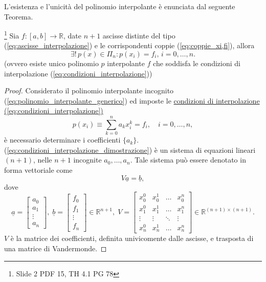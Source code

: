 L'esistenza e l'unicità del polinomio interpolante è enunciata dal seguente Teorema.
\begin{theorem}\label{th:esistenza_unicita_polinomio_interpolante}\footnote{Slide 2 PDF 15, TH 4.1 PG 78}
    Sia $f\colon [a,b]\rightarrow\mathbb{R}$, date $n+1$ ascisse distinte del tipo (\ref{eq:ascisse_interpolazione}) e le corrispondenti coppie (\ref{eq:coppie_xi,fi}), allora
    \begin{equation*}
    	\exists!\, p(x)\in\Pi_n: p(x_i)=f_i,\, i=0,\hdots,n.
    \end{equation*}
    (ovvero esiste unico polinomio $p$ interpolante $f$ che soddisfa le condizioni di interpolazione (\ref{eq:condizioni_interpolazione}))
\end{theorem}
\begin{proof}
    Considerato il polinomio interpolante incognito (\ref{eq:polinomio_interpolante_generico}) ed imposte le \underline{condizioni di interpolazione (\ref{eq:condizioni_interpolazione})} 
    \begin{equation}\label{eq:condizioni_interpolazione_dimostrazione}
        p(x_i)\equiv\sum_{k=0}^{n}a_kx_i^k=f_i,\quad i=0,\hdots,n,
    \end{equation}
    è necessario determinare i coefficienti $\{a_k\}$. (\ref{eq:condizioni_interpolazione_dimostrazione}) è un sistema di equazioni lineari $(n+1)$, nelle $n+1$ incognite $a_0,\hdots,a_n$. Tale sistema può essere denotato in forma vettoriale come
    \begin{equation}\label{eq:sistema_lineare_vandermonde}
        V\underline{a}=\underline{b},
    \end{equation}
    dove
    \begin{equation*}
        \underline{a} = 
    \begin{bmatrix}
        a_0\\
        a_1\\
        \vdots\\
        a_n
    \end{bmatrix},\; \underline{b}=
    \begin{bmatrix}
        f_0\\
        f_1\\
        \vdots\\
        f_n
    \end{bmatrix}\in\mathbb R^{n+1},\;
    V=\begin{bmatrix}
        x_0^0 & x_0^1 & \hdots & x_0^n\\
        x_1^0 & x_1^1 & \hdots & x_1^n\\
        \vdots & \vdots &\ddots & \vdots\\
        x_n^0 & x_n^1 & \hdots & x_n^n
    \end{bmatrix}\in\mathbb R^{(n+1)\times (n+1)}.
    \end{equation*}
    $V$ è la matrice dei coefficienti, definita univicomente dalle ascisse, e trasposta di una matrice di Vandermonde.
    

\end{proof}
